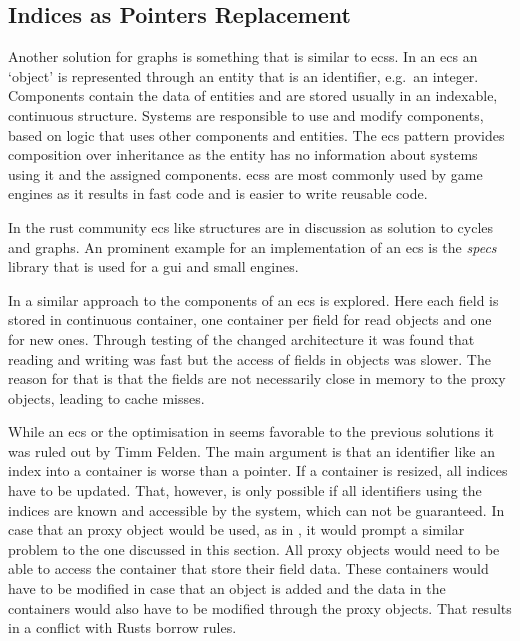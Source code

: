 \documentclass[thesis]{subfiles}
\begin{document}
  \subsection{Indices as Pointers Replacement}
    Another solution for graphs is something that is similar to \glspl{ecs}.
    In an \gls{ecs} an `object' is represented through an entity that is an identifier, e.g.~an integer.
    Components contain the data of entities and are stored usually in an indexable, continuous structure.
    Systems are responsible to use and modify components, based on logic that uses other components and entities.\autocite[209]{sfml}
    The \gls{ecs} pattern provides composition over inheritance as the entity has no information about systems using it and the assigned components.
    \glspl{ecs} are most commonly used by game engines as it results in fast code and is easier to write reusable code\autocites[209]{sfml}{ecs-acc-game}{ecs-hash}.

    In the rust community \gls{ecs} like structures are in discussion as solution to cycles and graphs\autocites{rust-graph-r4cpp}{rust-graph-leipzig}{rust-graph-niko}{rust-graph-exyr}.
    An prominent example for an implementation of an \gls{ecs} is the \emph{specs}\autocite{rust-specs} library that is used for a \gls{gui}\autocite{rust-xi} and small engines\autocites{rust-amethyst}{rust-rhusics}.

    In \autocite{skill-scala} a similar approach to the components of an \gls{ecs} is explored.
    Here each field is stored in continuous container, one container per field for read objects and one for new ones.
    Through testing of the changed architecture it was found that reading and writing was fast but the access of fields in objects was slower.
    The reason for that is that the fields are not necessarily close in memory to the proxy objects, leading to cache misses.
    \autocite{skill-scala}

    While an \gls{ecs} or the optimisation in \autocite{skill-scala} seems favorable to the previous solutions it was ruled out by Timm Felden.
    The main argument is that an identifier like an index into a container is worse than a pointer.
    If a container is resized, all indices have to be updated.
    That, however, is only possible if all identifiers using the indices are known and accessible by the system, which can not be guaranteed.
    In case that an proxy object would be used, as in \autocite{skill-scala}, it would prompt a similar problem to the one discussed in this section.
    All proxy objects would need to be able to access the container that store their field data.
    These containers would have to be modified in case that an object is added and the data in the containers would also have to be modified through the proxy objects.
    That results in a conflict with Rusts borrow rules.
\end{document}
